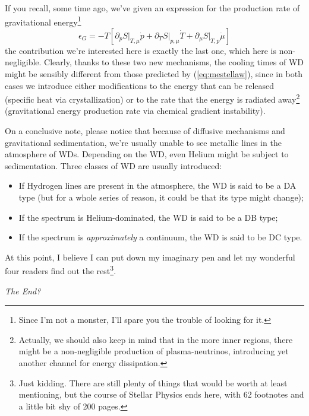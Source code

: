 \par If you recall, some time ago, we've given an expression for the production rate of gravitational energy\footnote{Since I'm not a monster, I'll spare you the trouble of looking for it.}
\begin{equation}
    \epsilon_{G} = -T\left[\partial_{p}S\Big|_{T,\mu}\dot{p} + \partial_{T}S\Big|_{p,\mu}\dot{T}+\partial_{\mu}S\Big|_{T,p}\dot{\mu}\right]
    \label{eq:gravprodrate}
\end{equation}
the contribution we're interested here is exactly the last one, which here is non-negligible. Clearly, thanks to these two new mechanisms, the cooling times of WD might be sensibly different from those predicted by (\ref{eq:mestellaw}), since in both cases we introduce either modifications to the energy that can be released (specific heat via crystallization) or to the rate that the energy is radiated away\footnote{Actually, we should also keep in mind that in the more inner regions, there might be a non-negligible production of plasma-neutrinos, introducing yet another channel for energy dissipation.} (gravitational energy production rate via chemical gradient instability).
\par On a conclusive note, please notice that because of diffusive mechanisms and gravitational sedimentation, we're usually unable to see metallic lines in the atmosphere of WDs. Depending on the WD, even Helium might be subject to sedimentation. Three classes of WD are usually introduced:
\begin{itemize}
    \item If Hydrogen lines are present in the atmosphere, the WD is said to be a DA type (but for a whole series of reason, it could be that its type might change);
    \item If the spectrum is Helium-dominated, the WD is said to be a DB type;
    \item If the spectrum is \emph{approximately} a continuum, the WD is said to be DC type.
\end{itemize}
\par At this point, I believe I can put down my imaginary pen and let my wonderful four readers find out the rest\footnote{Just kidding. There are still plenty of things that would be worth at least mentioning, but the course of Stellar Physics ends here, with 62 footnotes and a little bit shy of 200 pages.}.
\begin{flushright}
    \emph{The End?}
\end{flushright}